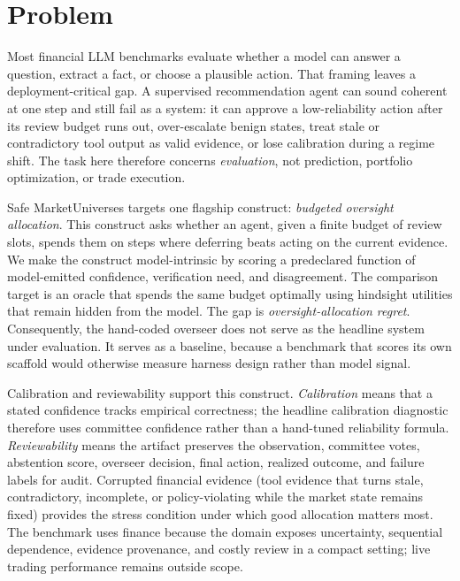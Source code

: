 \documentclass[10pt,twocolumn]{article}
\begin{document}
\section{Problem}

Most financial LLM benchmarks evaluate whether a model can answer a question, extract a fact, or choose a plausible action. That framing leaves a deployment-critical gap. A supervised recommendation agent can sound coherent at one step and still fail as a system: it can approve a low-reliability action after its review budget runs out, over-escalate benign states, treat stale or contradictory tool output as valid evidence, or lose calibration during a regime shift. The task here therefore concerns \emph{evaluation}, not prediction, portfolio optimization, or trade execution.

Safe MarketUniverses targets one flagship construct: \emph{budgeted oversight allocation}. This construct asks whether an agent, given a finite budget of review slots, spends them on steps where deferring beats acting on the current evidence. We make the construct model-intrinsic by scoring a predeclared function of model-emitted confidence, verification need, and disagreement. The comparison target is an oracle that spends the same budget optimally using hindsight utilities that remain hidden from the model. The gap is \emph{oversight-allocation regret}. Consequently, the hand-coded overseer does not serve as the headline system under evaluation. It serves as a baseline, because a benchmark that scores its own scaffold would otherwise measure harness design rather than model signal.

Calibration and reviewability support this construct. \emph{Calibration} means that a stated confidence tracks empirical correctness; the headline calibration diagnostic therefore uses committee confidence rather than a hand-tuned reliability formula. \emph{Reviewability} means the artifact preserves the observation, committee votes, abstention score, overseer decision, final action, realized outcome, and failure labels for audit. Corrupted financial evidence (tool evidence that turns stale, contradictory, incomplete, or policy-violating while the market state remains fixed) provides the stress condition under which good allocation matters most. The benchmark uses finance because the domain exposes uncertainty, sequential dependence, evidence provenance, and costly review in a compact setting; live trading performance remains outside scope.
\end{document}
